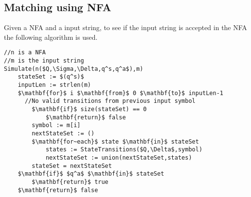 
\subsection{Matching using NFA}
Given a NFA and a input string, to see if the input string is accepted in the NFA the following algorithm is used.
\begin{lstlisting}[mathescape]
//n is a NFA
//m is the input string
Simulate(n($Q,\Sigma,\Delta,q^s,q^a$),m)
    stateSet := $(q^s)$
    inputLen := strlen(m)
    $\mathbf{for}$ i $\mathbf{from}$ 0 $\mathbf{to}$ inputLen-1
      //No valid transitions from previous input symbol
        $\mathbf{if}$ size(stateSet) == 0
            $\mathbf{return}$ false 
        symbol := m[i]
        nextStateSet := ()
        $\mathbf{for~each}$ state $\mathbf{in}$ stateSet
            states := StateTransitions($Q,\Delta$,symbol)
            nextStateSet := union(nextStateSet,states)
        stateSet = nextStateSet
    $\mathbf{if}$ $q^a$ $\mathbf{in}$ stateSet
        $\mathbf{return}$ true
    $\mathbf{return}$ false
\end{lstlisting}
